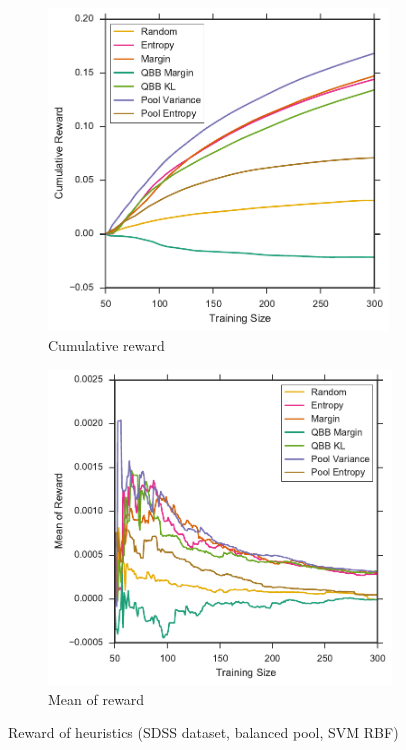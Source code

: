 \begin{figure}[p]
	\centering
	\begin{subfigure}{.5\textwidth}
		\centering
		\includegraphics[width=0.99\textwidth]{figures/5_thompson/sdss_br_sum_rewards}
		\caption{Cumulative reward}
		\label{fig:sdss_br_sum_rewards}
	\end{subfigure}%
	\begin{subfigure}{.5\textwidth}
		\centering
		\includegraphics[width=0.99\linewidth]{figures/5_thompson/sdss_br_avg_rewards}
		\caption{Mean of reward}
		\label{fig:sdss_br_avg_rewards}
	\end{subfigure}
	\caption[Reward of heuristics (SDSS, balanced, SVM RBF)]{
		Reward of heuristics (SDSS dataset, balanced pool, SVM RBF)}
	\label{fig:sdss_br_rewards}
\end{figure}


